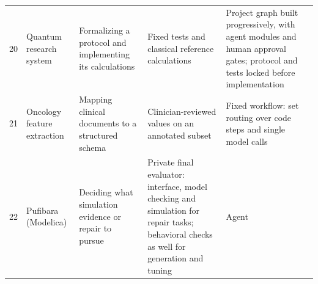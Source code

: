 \documentclass[10pt]{article}
\begin{document}
{\begin{longtable}{@{}r P{3.3cm} P{4.2cm} P{3.9cm} P{3.3cm}@{}}
20 & Quantum research system & Formalizing a protocol and implementing its calculations & Fixed tests and classical reference calculations & Project graph built progressively, with agent modules and human approval gates; protocol and tests locked before implementation \\
21 & Oncology feature extraction & Mapping clinical documents to a structured schema & Clinician-reviewed values on an annotated subset & Fixed workflow: set routing over code steps and single model calls \\
22 & Pufibara (Modelica) & Deciding what simulation evidence or repair to pursue & Private final evaluator: interface, model checking and simulation for repair tasks; behavioral checks as well for generation and tuning & Agent \\
\end{longtable}
}
\end{document}
